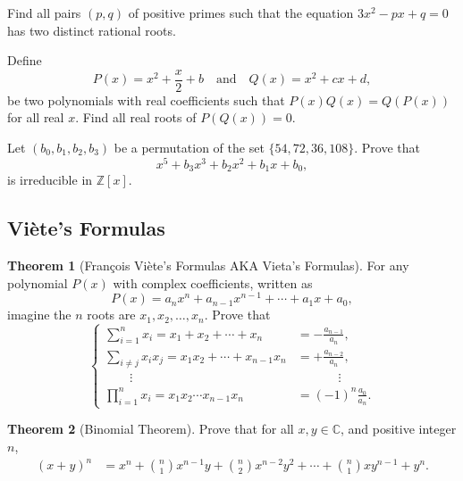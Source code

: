 \documentclass[12pt,a4paper]{memoir}
\theoremstyle{definition}
\newtheorem{theorem}{Theorem}
\begin{document}
\begin{question}[name={1993 Italy}]
	Find all pairs $(p,q)$ of positive primes such that the equation $3x^2 - px + q = 0$ has two distinct rational roots.
\end{question}

\begin{question}[name={2017 Romania}]
	Define \[P(x)=x^2+\dfrac x 2 +b\quad \text{and} \quad Q(x)=x^2+cx+d,\] be two polynomials with real coefficients such that $P(x)Q(x)=Q(P(x))$ for all real $x$. Find all real roots of $P(Q(x))=0$.
\end{question}

\begin{question}[name={2008 Iran Third Round}]
	Let $(b_0,b_1,b_2,b_3)$ be a permutation of the set $\{54,72,36,108\}$. Prove that \[x^5+b_3x^3+b_2x^2+b_1x+b_0,\] is irreducible in $\mathbb Z[x]$.
\end{question}


\subsection{Viète's Formulas}

\begin{tcolorbox}[title={Vieta's Formulas}]
	\begin{theorem}[François Viète's Formulas AKA Vieta's Formulas]
		For any polynomial $P(x)$ with complex coefficients, written as
		\[P(x)=a_nx^n+a_{n-1}x^{n-1} + \cdots + a_1x + a_0,\]
		imagine the $n$ roots are $x_1,x_2,\dots,x_n$. Prove that
		\[
		\begin{cases}
			\displaystyle \sum_{i=1}^n x_i = x_1+x_2+\cdots+x_n &= \displaystyle -\frac{a_{n-1}}{a_n},\\
			\displaystyle \sum_{i\neq j} x_ix_j = x_1x_2+\cdots+x_{n-1}x_n &= \displaystyle +\frac{a_{n-2}}{a_n},\\
			\qquad \vdots &\phantom{=} \qquad \vdots\\
			\displaystyle \prod_{i=1}^n x_i= x_1x_2\cdots x_{n-1}x_n &= \displaystyle (-1)^{n}\frac{a_0}{a_n}.
		\end{cases}
		\]
	\end{theorem}
\end{tcolorbox}

\begin{tcolorbox}[title={Binomial Theorem}]
	\begin{theorem}[Binomial Theorem]
		Prove that for all $x,y \in \mathbb C$, and positive integer $n$,
		\begin{align*}
			(x+y)^n &= x^n + \binom{n}{1}x^{n-1}y + \binom{n}{2}x^{n-2}y^2 + \cdots + \binom{n}{1}xy^{n-1} + y^n.
		\end{align*}
	\end{theorem}
\end{tcolorbox}
\end{document}
